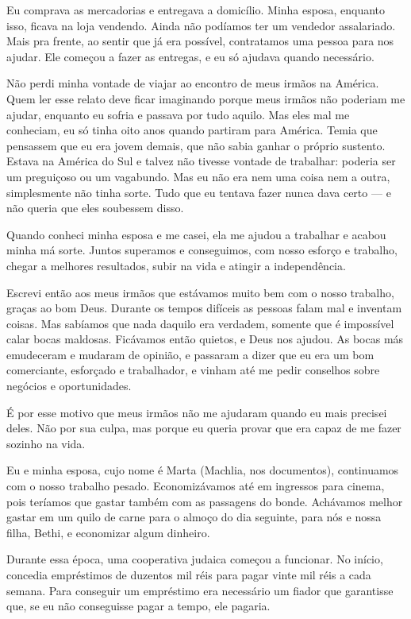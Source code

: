 Eu comprava as mercadorias e entregava a domicílio. Minha esposa,
enquanto isso, ficava na loja vendendo. Ainda não podíamos ter um
vendedor assalariado. Mais pra frente, ao sentir que já era possível, 
contratamos uma pessoa para nos ajudar. Ele começou a fazer
as entregas, e eu só ajudava quando necessário.

Não perdi minha vontade de viajar ao encontro de meus irmãos
na América. Quem ler esse relato deve ficar imaginando porque meus irmãos não
poderiam me ajudar, enquanto eu sofria e passava por tudo aquilo. 
Mas eles mal me conheciam, eu só tinha oito anos quando partiram para América. 
Temia que pensassem que eu era jovem demais, que não sabia ganhar o próprio sustento. 
Estava na América do Sul e talvez não tivesse vontade de
trabalhar: poderia ser um preguiçoso ou um vagabundo. Mas eu não era nem uma coisa
nem a outra, simplesmente não tinha sorte. Tudo que eu tentava fazer
nunca dava certo --- e não queria que eles soubessem disso.

Quando conheci minha esposa e me casei, ela me ajudou a trabalhar e
acabou minha má sorte. Juntos superamos e conseguimos, com nosso
esforço e trabalho, chegar a melhores resultados, subir
na vida e atingir a independência.

Escrevi então aos meus irmãos que estávamos muito bem com o nosso
trabalho, graças ao bom Deus. Durante os tempos difíceis as
pessoas falam mal e inventam coisas. Mas sabíamos que
nada daquilo era verdadem, somente que é impossível calar bocas maldosas.
Ficávamos então quietos, e Deus nos ajudou. As bocas más emudeceram e mudaram
de opinião, e passaram a dizer que eu era um bom comerciante, esforçado e trabalhador,
e vinham até me pedir conselhos sobre negócios e oportunidades.

É por esse motivo que meus irmãos não me ajudaram quando
eu mais precisei deles. Não por sua culpa, mas porque eu queria
provar que era capaz de me fazer sozinho na vida.

Eu e minha esposa, cujo nome é Marta (Machlia, nos documentos), continuamos
com o nosso trabalho pesado. Economizávamos até em ingressos para cinema,
pois teríamos que gastar também com as passagens do bonde.
Achávamos melhor gastar em um quilo de carne para o almoço do dia
seguinte, para nós e nossa filha, Bethi, e economizar algum dinheiro.

Durante essa época, uma cooperativa judaica começou a funcionar. No início, 
concedia empréstimos de duzentos mil réis para pagar vinte mil réis a
cada semana. Para conseguir um empréstimo era necessário um fiador que garantisse que, 
se eu não conseguisse pagar a tempo, ele pagaria.

